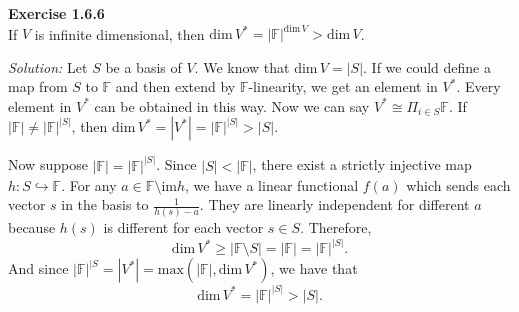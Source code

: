 \documentclass[a4paper, 11pt]{article}
\newenvironment{problem}[2][Exercise]
    { \begin{mdframed}[backgroundcolor=gray!20] \textbf{#1 #2} \\}
    {  \end{mdframed}}
\newenvironment{solution}
    {\textit{Solution:}}
    {}
\begin{document}
\begin{problem}{1.6.6}
If \(V\) is infinite dimensional, then \(\text{dim}\, V^*=|\mathbb{F}|^{\text{dim}\, V}>\text{dim}\, V\).
    
\end{problem}
\begin{solution}
Let \(S\) be a basis of \(V\). We know that \(\text{dim}\, V=|S|\). If we could define a map from \(S\) to \(\mathbb{F}\) and then extend by \(\mathbb{F}\)-linearity, we get an element in \(V^*\). Every element in \(V^*\) can be obtained in this way. Now we can say \(V^*\cong \Pi_{i\in S}\mathbb{F}\). If \(|\mathbb{F}|\neq |\mathbb{F}|^{|S|}\), then \(\text{dim}\, V^*=|V^*|=|\mathbb{F}|^{|S|}>|S|\).
\par
Now suppose \(|\mathbb{F}|= |\mathbb{F}|^{|S|}\). Since \(|S|<|\mathbb{F}|\), there exist a strictly injective map \(h:S\hookrightarrow \mathbb{F}\). For any \(a\in \mathbb{F}\setminus \text{im}h\), we have a linear functional \(f(a)\) which sends each vector \(s\) in the basis to \(\frac{1}{h(s)-a}\). They are linearly independent for different \(a\) because \(h(s)\) is different for each vector \(s\in S\). Therefore, 
$$\text{dim}\, V^*\geq |\mathbb{F}\setminus S|=|\mathbb{F}|=|\mathbb{F}|^{|S|}.$$
And since \(|\mathbb{F}|^{|S}=|V^*|=\text{max}(|\mathbb{F}|,\text{dim}\, V^*)\), we have that 
$$\text{dim}\, V^*=|\mathbb{F}|^{|S|}>|S|.$$
\end{solution}
\end{document}
